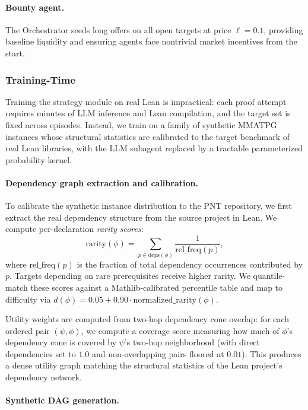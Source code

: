 \paragraph{Bounty agent.}
The Orchestrator seeds long offers on all open targets at price $\ell = 0.1$, providing baseline liquidity and ensuring agents face nontrivial market incentives from the start.
 
 
\subsubsection{Training-Time}\label{sec:training-approximation}
 
Training the strategy module on real Lean is impractical: each proof attempt requires minutes of LLM inference and Lean compilation, and the target set is fixed across episodes. Instead, we train on a family of synthetic MMATPG instances whose structural statistics are calibrated to the target benchmark of real Lean libraries, with the LLM subagent replaced by a tractable parameterized probability kernel.
 
\paragraph{Dependency graph extraction and calibration.}
To calibrate the synthetic instance distribution to the PNT repository, we first extract the real dependency structure from the source project in Lean. We compute per-declaration \emph{rarity scores}:
\[
\mathrm{rarity}(\phi) = \sum_{p \in \mathrm{deps}(\phi)} \frac{1}{\mathrm{rel\_freq}(p)},
\]
where $\mathrm{rel\_freq}(p)$ is the fraction of total dependency occurrences contributed by $p$. Targets depending on rare prerequisites receive higher rarity. We quantile-match these scores against a Mathlib-calibrated percentile table and map to difficulty via $d(\phi) = 0.05 + 0.90 \cdot \mathrm{normalized\_rarity}(\phi)$.

Utility weights are computed from two-hop dependency cone overlap: for each ordered pair $(\psi, \phi)$, we compute a coverage score measuring how much of $\phi$'s dependency cone is covered by $\psi$'s two-hop neighborhood (with direct dependencies set to $1.0$ and non-overlapping pairs floored at $0.01$). This produces a dense utility graph matching the structural statistics of the Lean project's dependency network.
 
\paragraph{Synthetic DAG generation.}

